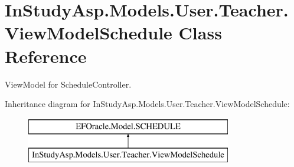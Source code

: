 \hypertarget{class_in_study_asp_1_1_models_1_1_user_1_1_teacher_1_1_view_model_schedule}{}\section{In\+Study\+Asp.\+Models.\+User.\+Teacher.\+View\+Model\+Schedule Class Reference}
\label{class_in_study_asp_1_1_models_1_1_user_1_1_teacher_1_1_view_model_schedule}


View\+Model for Schedule\+Controller.  


Inheritance diagram for In\+Study\+Asp.\+Models.\+User.\+Teacher.\+View\+Model\+Schedule\+:\begin{figure}[H]
\begin{center}
\leavevmode
\includegraphics[height=2.000000cm]{class_in_study_asp_1_1_models_1_1_user_1_1_teacher_1_1_view_model_schedule}
\end{center}
\end{figure}
